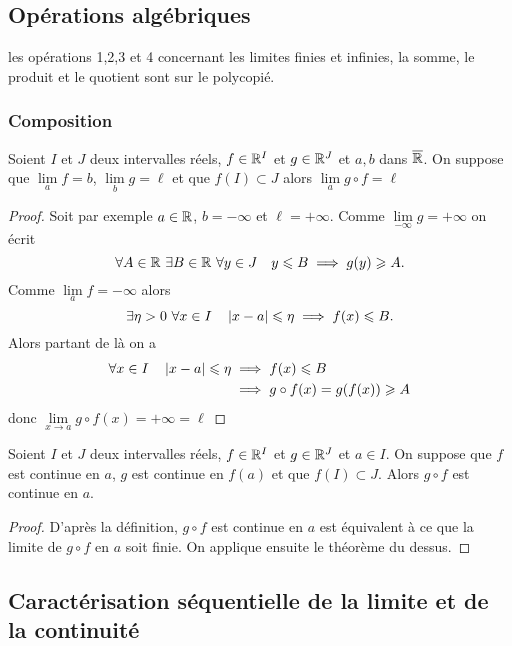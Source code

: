 \subsection{Opérations algébriques}

les opérations 1,2,3 et 4 concernant les limites finies et infinies, la somme, le produit et le quotient sont sur le polycopié.

\subsubsection{Composition}
\begin{theo}
  Soient $I$ et $J$ deux intervalles réels, $f \in \mathbb{R}^I$ et $g \in \mathbb{R}^J$ et $a,b$ dans $\overline{\mathbb{R}}$. On suppose que $\lim\limits_{a}f=b$, $\lim\limits_{b}g=\ell$ et que $f(I) \subset J$ alors $\lim\limits_{a} g \circ f=\ell$
\end{theo}
\begin{proof}
  Soit par exemple $a \in \mathbb{R}$, $b=-\infty$ et $\ell=+\infty$. Comme $\lim\limits_{-\infty}g=+\infty$ on écrit
  \begin{equation}
    \forall A \in \mathbb{R} \ \exists B \in \mathbb{R} \ \forall y \in J \quad y \leqslant B \implies g(y) \geqslant A.
  \end{equation}
  Comme $\lim\limits_{a}f=-\infty$ alors
  \begin{equation}
    \exists \eta > 0 \ \forall x \in I \quad \left\lvert x-a\right\rvert \leqslant \eta \implies f(x) \leqslant B.
  \end{equation}
  Alors partant de là on a
\begin{align}
  \forall x \in I \quad \left\lvert x-a\right\rvert \leqslant \eta &\implies f(x) \leqslant B\\
  &\implies g \circ f(x)=g(f(x)) \geqslant A
\end{align}
donc $\lim\limits_{x \to a} g \circ f(x)=+\infty=\ell$
\end{proof}
\begin{cor}
  Soient $I$ et $J$ deux intervalles réels, $f \in \mathbb{R}^I$ et $g \in \mathbb{R}^J$ et $a \in I$. On suppose que $f$ est continue en $a$, $g$ est continue en $f(a)$ et que $f(I) \subset J$. Alors $g \circ f$ est continue en $a$.
\end{cor}
\begin{proof}
  D'après la définition, $g \circ f$ est continue en $a$ est équivalent à ce que la limite de $g \circ f$ en $a$ soit finie. On applique ensuite le théorème du dessus.
\end{proof}

\subsection[Caractérisation séquentielle]{Caractérisation séquentielle de la limite et de la continuité}

